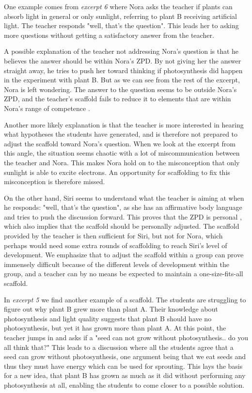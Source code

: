 One example comes from \emph{excerpt 6} where Nora asks the teacher if plants can absorb light in general or only sunlight, referring to plant B receiving artificial light. The teacher responds "well, that's the question". This leads her to asking more questions without getting a satisfactory answer from the teacher. 

A possible explanation of the teacher not addressing Nora's question is that he believes the answer should  be within Nora's ZPD. By not giving her the answer straight away, he tries to push her toward thinking if photosynthesis did happen in the experiment with plant B. But as we can see from the rest of the excerpt, Nora is left wondering. The answer to the question seems to be outside Nora's ZPD, and the teacher's scaffold fails to reduce it to elements that are within Nora's range of competence \citep{wood1976role}. 

Another more likely explanation is that the teacher is more interested in hearing what hypotheses the students have generated, and is therefore not prepared to adjust the scaffold toward Nora's question. When we look at the excerpt from this angle, the situation seems chaotic with a lot of miscommunication between the teacher and Nora. This makes Nora hold on to the misconception that only sunlight is able to excite electrons. An opportunity for scaffolding to fix this misconception is therefore missed.  

On the other hand, Siri seems to understand what the teacher is aiming at when he responds: "well, that's the question", as she has an affirmative body language and tries to push the discussion forward. This proves that the ZPD is personal \citep{vygotskiui1978mind}, which also implies that the scaffold should be personally adjusted. The scaffold provided by the teacher is then sufficient for Siri, but not for Nora, which perhaps would need some extra rounds of scaffolding to reach Siri's level of development. We emphasize that to adjust the scaffold within a group can prove immensely difficult because of the different levels of development within the group, and a teacher can by no means be expected to maintain a one-size-fits-all scaffold.

In \emph{excerpt 5} we find another example of a scaffold. The students are struggling to figure out why plant B grew more than plant A. Their knowledge about photosynthesis and light quality suggests that plant B should have no photosynthesis, but yet it has grown more than plant A. At this point, the teacher jumps in and asks if a "seed can not grow without photosynthesis.. do you all think that?" This leads to a discussion where all the students agree that a seed can grow without photosynthesis, one argument being that we eat seeds and thus they must have energy which can be used for sprouting. This lays the basis for a new idea, that plant B has grown as much as it did without performing any photosynthesis at all, enabling the students to come closer to a possible solution. 


